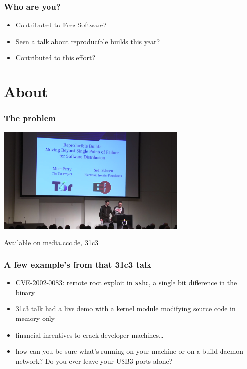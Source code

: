 \documentclass[14pt,aspectratio=169]{beamer}
\begin{document}
\begin{frame}
 \frametitle{Who are you?}
 \begin{itemize}
  \item Contributed to Free Software?
  \item<2-3> Seen a talk about reproducible builds this year?
  \item<3> Contributed to this effort?
 \end{itemize}
\end{frame}

\section{About}

\begin{frame}
 \frametitle{The problem}

 \begin{center}
  \includegraphics[width=0.7\textwidth]{images/31c3.png}

  Available on \url{media.ccc.de}, 31c3
 \end{center}
\end{frame}

\begin{frame}[fragile]
 \frametitle{A few example's from that 31c3 talk}
 \begin{itemize}
  \item CVE-2002-0083: remote root exploit in \texttt{sshd}, a single bit difference in the binary
  \item 31c3 talk had a live demo with a kernel module modifying source code in memory only
  \item financial incentives to crack developer machines…
  \item how can you be sure what's running on your machine or on a build
  daemon network? Do you ever leave your USB3 ports alone?
 \end{itemize}
\end{frame}
\end{document}
